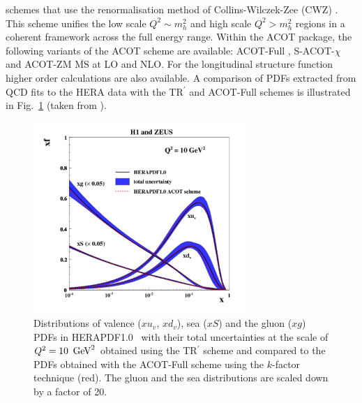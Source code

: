 \begin{itemize}
schemes that use the renormalisation method of Collins-Wilczek-Zee (CWZ) \cite{CWZ}.
This scheme unifies the low scale $Q^2 \sim m_h^2$ and high scale $Q^2 > m_h^2$ regions
in a coherent framework across the full energy range.
%
Within the ACOT package, the following variants of the ACOT scheme are available:
ACOT-Full \cite{Aivazis:1993pi}, S-ACOT-$\chi$ \cite{Kramer:2000hn,Kretzer:2003it} and ACOT-ZM \cite{Aivazis:1993pi}
$\overline{\text{MS}}$ at LO and NLO. 
For the longitudinal structure function higher order calculations are also available. 
A comparison of PDFs extracted from QCD fits to the HERA data 
with the TR$^\prime$ and ACOT-Full schemes is illustrated in Fig.~\ref{fig:acotrt} (taken from \cite{h1zeus:2009wt}).

\begin{figure}[!ht]
\centering
\includegraphics[width=8cm]{heraacot}
   \caption{Distributions of valence ($xu_v$, $xd_v$), sea ($xS$) and the gluon ($xg$) PDFs in HERAPDF1.0~\cite{h1zeus:2009wt}
       with their total uncertainties at the scale of $Q^2 = 10\ \,\text{Ge\hspace{-.08em}V}^2$ obtained 
       using the TR$^\prime$ scheme and compared to the PDFs obtained with 
       the ACOT-Full scheme using the $k$-factor technique (red).
       The gluon and the sea distributions are scaled down by a factor of 20.}
 \label{fig:acotrt}
\end{figure}


\end{itemize}

